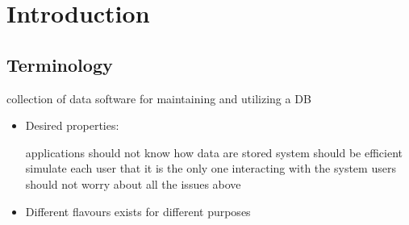 
\section{Introduction}
\subsection{Terminology}
\begin{itemize}
     collection of data
     software for maintaining and utilizing a DB
    \begin{itemize}
        \item Desired properties:
            \begin{itemize}
                 applications should not know how data are stored
                 system should be efficient
                 simulate each user that it is the only one interacting with the system
                 users should not worry about all the issues above
            \end{itemize}
        \item Different flavours exists for different purposes
    \end{itemize}
\end{itemize}

